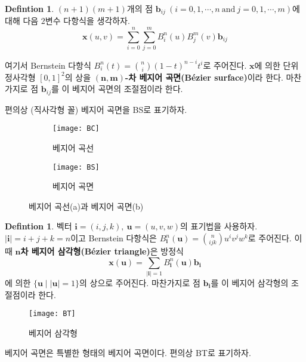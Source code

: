\documentclass[10pt]{gshs-report-v2.0}
\theoremstyle{theorem}
\theoremstyle{lemma}
\theoremstyle{definition}
\newtheorem{definition}[theorem]{Defintion}
\begin{document}
\begin{definition} \label{BS}
	$(n+1)(m+1)$개의 점 $\mathbf{b}_{ij}\ (i=0, 1, \cdots, n\ \mathrm{and}\ j=0, 1, \cdots, m)$에 대해 다음 $2$변수 다항식을 생각하자. 
	\begin{equation}
		\mathbf{x}(u, v)=\sum_{i=0}^n\sum_{j=0}^m B_i^n(u)B_j^m(v)\mathbf{b}_{ij} 
	\end{equation}
	
	여기서 Bernstein 다항식 $B_i^n(t)=\binom ni(1-t)^{n-i}t^i$로 주어진다. $\mathbf{x}$에 의한 단위 정사각형 $[0, 1]^2$의 상을 \textbf{$\boldsymbol{(n, m)}$-차 베지어 곡면(Bézier surface)}이라 한다. 마찬가지로 점 $\mathbf{b}_{ij}$를 이 베지어 곡면의 조절점이라 한다.\cite{Farin}
\end{definition}

편의상 (직사각형 꼴) 베지어 곡면을 BS로 표기하자. 

\begin{figure}[h]
	\centering
	\begin{subfigure}[b]{.45\textwidth}
		\centering
		\texttt{[image: BC]}
		\caption{베지어 곡선}
	\end{subfigure}
	\hfill
	\begin{subfigure}[b]{.45\textwidth}
		\centering
		\texttt{[image: BS]}
		\caption{베지어 곡면}
	\end{subfigure}
	\caption{베지어 곡선(a)과 베지어 곡면(b)}
\end{figure}

\begin{definition} \label{BT}
	벡터 $\mathbf{i}=(i, j, k),\ \mathbf{u}=(u, v, w)$의 표기법을 사용하자. $|\mathbf{i}|=i+j+k=n$이고 Bernstein 다항식은 $B_\mathbf{i}^n(\mathbf{u})=\binom n{i j k}u^iv^jw^k$로 주어진다. 이때 \textbf{$\textbf{n}$차 베지어 삼각형(Bézier triangle)}은 방정식
	\begin{equation}
		\mathbf{x}(\mathbf{u})=\sum_{|\mathbf{i}|=1}B_\mathbf{i}^n(\mathbf{u})\mathbf{b}_\mathbf{i}
	\end{equation}
	에 의한 $\{\mathbf{u}\mid|\mathbf{u}|=1\}$의 상으로 주어진다. 마찬가지로 점 $\mathbf{b}_\mathbf{i}$를 이 베지어 삼각형의 조절점이라 한다.\cite{Farin}
\end{definition}

\begin{figure}[h]
	\centering
	\texttt{[image: BT]}
	\caption{베지어 삼각형}
\end{figure}

베지어 곡면은 특별한 형태의 베지어 곡면이다. 편의상 BT로 표기하자. 
\end{document}
